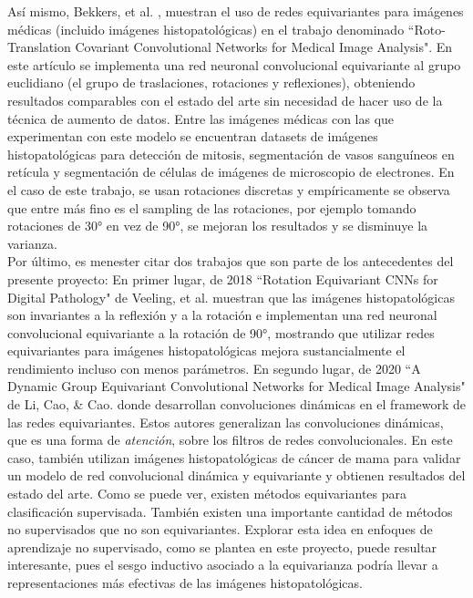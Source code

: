 \documentclass[12pt,letterpaper,final, openany]{scrbook}
\begin{document}
Así mismo, Bekkers, et al. \cite{bekkers_roto-translation_2018}, muestran el uso de redes equivariantes para imágenes médicas (incluido imágenes histopatológicas) en el trabajo denominado ``Roto-Translation Covariant Convolutional Networks for Medical Image Analysis". En este artículo se implementa una red neuronal convolucional equivariante al grupo euclidiano (el grupo de traslaciones, rotaciones y reflexiones), obteniendo resultados comparables con el estado del arte sin necesidad de hacer uso de la técnica de aumento de datos. Entre las imágenes médicas con las que experimentan con este modelo se encuentran datasets de imágenes histopatológicas para detección de mitosis, segmentación de vasos sanguíneos en retícula y segmentación de células de imágenes de microscopio de electrones. En el caso de este trabajo, se usan rotaciones discretas y empíricamente se observa que entre más fino es el sampling de las rotaciones, por ejemplo tomando rotaciones de 30° en vez de 90°, se mejoran los resultados y se disminuye la varianza.
\\
Por último, es menester citar dos trabajos que son parte de los antecedentes del presente proyecto: En primer lugar, de 2018 ``Rotation Equivariant CNNs for Digital Pathology" de Veeling, et al. \cite{veeling_rotation_2018} muestran que las imágenes histopatológicas son invariantes a la reflexión y a la rotación e implementan una red neuronal convolucional equivariante a la rotación de 90°, mostrando que utilizar redes equivariantes para imágenes histopatológicas mejora sustancialmente el rendimiento incluso con menos parámetros. En segundo lugar, de 2020 ``A Dynamic Group Equivariant Convolutional Networks for Medical Image Analysis" de Li, Cao, \& Cao. \cite{li_dynamic_2020} donde desarrollan convoluciones dinámicas en el framework de las redes equivariantes. Estos autores generalizan las convoluciones dinámicas, que es una forma de \textit{atención}, sobre los filtros de redes convolucionales. En este caso, también utilizan imágenes histopatológicas de cáncer de mama para validar un modelo de red convolucional dinámica y equivariante y obtienen resultados del estado del arte.
Como se puede ver, existen métodos equivariantes para clasificación supervisada. También existen una importante cantidad de métodos no supervisados que no son equivariantes. Explorar esta idea en enfoques de aprendizaje no supervisado, como se plantea en este proyecto, puede resultar interesante, pues el sesgo inductivo asociado a la equivarianza podría llevar a representaciones más efectivas de las imágenes histopatológicas.
\end{document}
